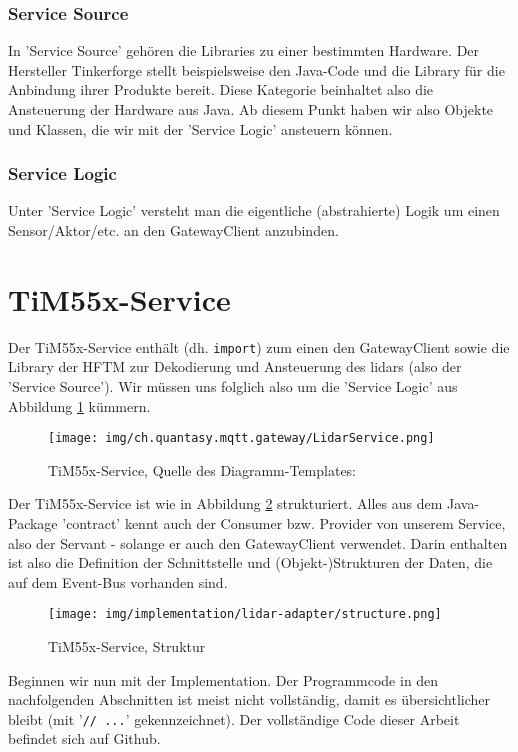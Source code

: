 \subsubsection{Service Source}
In 'Service Source' gehören die Libraries zu einer bestimmten Hardware. Der Hersteller Tinkerforge\cite{tinkerforge-gmbh} stellt beispielsweise den Java-Code und die Library für die Anbindung ihrer Produkte bereit. Diese Kategorie beinhaltet also die Ansteuerung der Hardware aus Java. Ab diesem Punkt haben wir also Objekte und Klassen, die wir mit der 'Service Logic' ansteuern können.
\subsubsection{Service Logic}
Unter 'Service Logic' versteht man die eigentliche (abstrahierte) Logik um einen Sensor/Aktor/etc. an den GatewayClient anzubinden.


\section{TiM55x-Service}
Der TiM55x-Service enthält (dh. \verb|import|) zum einen den GatewayClient sowie die Library der HFTM zur Dekodierung und Ansteuerung des \acrshort{lidar}s (also der 'Service Source'). Wir müssen uns folglich also um die 'Service Logic' aus Abbildung \ref{fig:lidarservice} kümmern.
\begin{figure}[H]
	\centering
	\texttt{[image: img/ch.quantasy.mqtt.gateway/LidarService.png]}
	\caption{TiM55x-Service, Quelle des Diagramm-Templates: \cite{ch.quantasy.mqtt.gateway}}
	\label{fig:lidarservice}
\end{figure}

Der TiM55x-Service ist wie in Abbildung \ref{fig:structure_lidarservice} strukturiert. Alles aus dem Java-Package 'contract' kennt auch der Consumer bzw. Provider von unserem Service, also der Servant - solange er auch den GatewayClient verwendet. Darin enthalten ist also die Definition der Schnittstelle und (Objekt-)Strukturen der Daten, die auf dem Event-Bus vorhanden sind.
\begin{figure}[H]
	\centering
	\texttt{[image: img/implementation/lidar-adapter/structure.png]}
	\caption{TiM55x-Service, Struktur}
	\label{fig:structure_lidarservice}
\end{figure}

Beginnen wir nun mit der Implementation. Der Programmcode in den nachfolgenden Abschnitten ist meist nicht vollständig, damit es übersichtlicher bleibt (mit '\verb|// ...|' gekennzeichnet). Der vollständige Code dieser Arbeit befindet sich auf Github\cite{github-thesis}. \\
